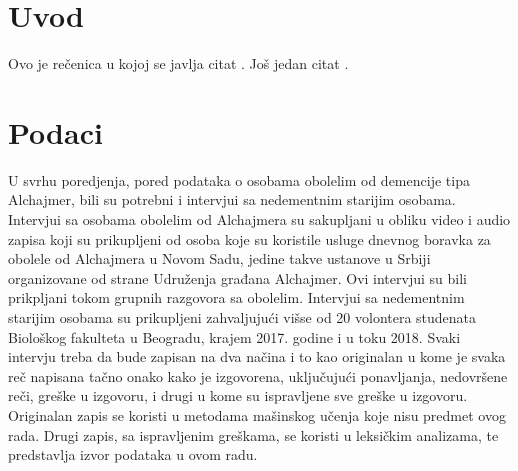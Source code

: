 \documentclass[12pt,oneside]{memoir}
\begin{document}
\frontmatter
\naslovna
\komisija
\apstrakt
\tableofcontents*

\mainmatter

\chapter{Uvod}

Ovo je rečenica u kojoj se javlja citat \cite{PetrovicMikic2015}.
Još jedan citat \cite{GuSh:243}.

\chapter{Podaci}

U svrhu poredjenja, pored podataka o osobama obolelim od demencije tipa Alchajmer, bili su potrebni i intervjui sa nedementnim starijim osobama. Intervjui sa osobama obolelim od Alchajmera su sakupljani u obliku video i audio zapisa koji su prikupljeni od osoba koje su koristile usluge dnevnog boravka za obolele od Alchajmera u Novom Sadu, jedine takve ustanove u Srbiji organizovane od strane Udruženja građana Alchajmer. Ovi intervjui su bili prikpljani tokom grupnih razgovora sa obolelim. Intervjui sa nedementnim starijim osobama su prikupljeni zahvaljujući višse od 20 volontera studenata Biološkog fakulteta u Beogradu, krajem 2017. godine i u toku 2018.
Svaki intervju treba da bude zapisan na dva načina i to kao originalan u kome je svaka reč napisana tačno onako kako je izgovorena, uključujući ponavljanja, nedovršene reči, greške u izgovoru, i drugi u kome su ispravljene sve greške u izgovoru. Originalan zapis se koristi u metodama mašinskog učenja koje nisu predmet ovog rada. Drugi zapis, sa ispravljenim greškama, se koristi u leksičkim analizama, te predstavlja izvor podataka u ovom radu.
\end{document}
